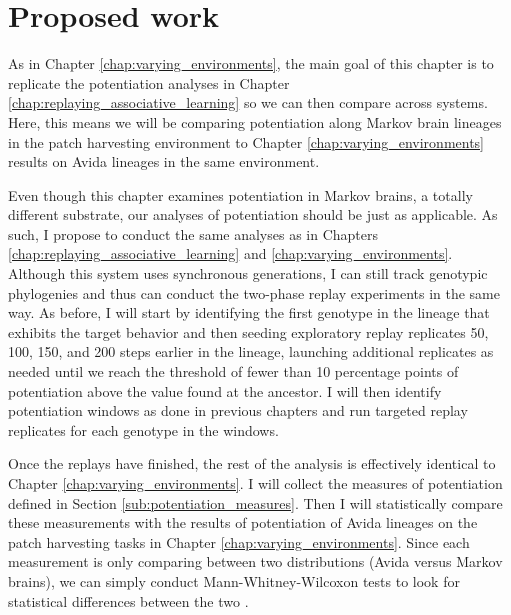 \section{Proposed work}

As in Chapter \ref{chap:varying_environments}, the main goal of this chapter is to replicate the potentiation analyses in Chapter \ref{chap:replaying_associative_learning} so we can then compare across systems. 
Here, this means we will be comparing potentiation along Markov brain lineages in the patch harvesting environment to Chapter 
\ref{chap:varying_environments} results on Avida lineages in the same environment.

Even though this chapter examines potentiation in Markov brains, a totally different substrate, our analyses of potentiation should be just as applicable. 
As such, I propose to conduct the same analyses as in Chapters \ref{chap:replaying_associative_learning} and \ref{chap:varying_environments}. 
Although this system uses synchronous generations, I can still track genotypic phylogenies and thus can conduct the two-phase replay experiments in the same way. 
As before, I will start by identifying the first genotype in the lineage that exhibits the target behavior and then seeding exploratory replay replicates 50, 100, 150, and 200 steps earlier in the lineage, launching additional replicates as needed until we reach the threshold of fewer than 10 percentage points of potentiation above the value found at the ancestor. 
I will then identify potentiation windows as done in previous chapters and run targeted replay replicates for each genotype in the windows. 

Once the replays have finished, the rest of the analysis is effectively identical to Chapter \ref{chap:varying_environments}. 
I will collect the measures of potentiation defined in Section \ref{sub:potentiation_measures}. 
Then I will statistically compare these measurements with the results of potentiation of Avida lineages on the patch harvesting tasks in Chapter \ref{chap:varying_environments}. 
Since each measurement is only comparing between two distributions (Avida versus Markov brains), we can simply conduct Mann-Whitney-Wilcoxon tests to look for statistical differences between the two \citep{10.2307/3001968}. 

